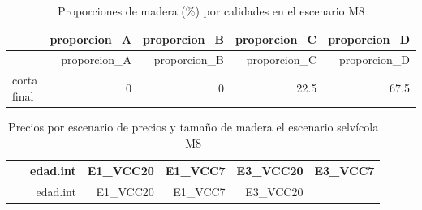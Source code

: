 \documentclass[]{article}
\begin{document}
\begin{longtable}[]{@{}lrrrr@{}}
\caption{Proporciones de madera (\%) por calidades en el escenario
M8}\tabularnewline
\toprule
& proporcion\_A & proporcion\_B & proporcion\_C &
proporcion\_D\tabularnewline
\midrule
\endfirsthead
\toprule
& proporcion\_A & proporcion\_B & proporcion\_C &
proporcion\_D\tabularnewline
\midrule
\endhead
corta final & 0 & 0 & 22.5 & 67.5\tabularnewline
\bottomrule
\end{longtable}

\begin{longtable}[]{@{}lrrrrr@{}}
\caption{Precios por escenario de precios y tamaño de madera el
escenario selvícola M8}\tabularnewline
\toprule
\begin{minipage}[b]{0.21\columnwidth}\raggedright\strut
~\strut
\end{minipage} & \begin{minipage}[b]{0.13\columnwidth}\raggedleft\strut
edad.int\strut
\end{minipage} & \begin{minipage}[b]{0.13\columnwidth}\raggedleft\strut
E1\_VCC20\strut
\end{minipage} & \begin{minipage}[b]{0.12\columnwidth}\raggedleft\strut
E1\_VCC7\strut
\end{minipage} & \begin{minipage}[b]{0.13\columnwidth}\raggedleft\strut
E3\_VCC20\strut
\end{minipage} & \begin{minipage}[b]{0.13\columnwidth}\raggedleft\strut
E3\_VCC7\strut
\end{minipage}\tabularnewline
\midrule
\endfirsthead
\toprule
\begin{minipage}[b]{0.21\columnwidth}\raggedright\strut
~\strut
\end{minipage} & \begin{minipage}[b]{0.13\columnwidth}\raggedleft\strut
edad.int\strut
\end{minipage} & \begin{minipage}[b]{0.13\columnwidth}\raggedleft\strut
E1\_VCC20\strut
\end{minipage} & \begin{minipage}[b]{0.12\columnwidth}\raggedleft\strut
E1\_VCC7\strut
\end{minipage} & \begin{minipage}[b]{0.13\columnwidth}\raggedleft\strut
E3\_VCC20\strut
\end{minipage} & \begin{minipage}[b]{0.13\columnwidth}\raggedleft\strut

\end{minipage}
\end{longtable}
\end{document}
